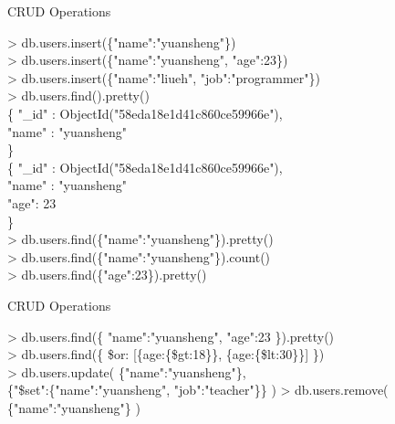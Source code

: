 \documentclass{beamer}
\begin{document}
\begin{frame}{CRUD Operations}
    \begin{minipage}[t]{0.7\textwidth}
        \scriptsize
        \begin{Alms*}
            > db.users.insert(\{"name":"yuansheng"\}) \\
            > db.users.insert(\NI\{"name":"yuansheng", "age":23\}\ND) \\
            > db.users.insert(\NI\{"name":"liueh", "job":"programmer"\}\ND) \\
            > db.users.find().pretty() \\
            \{ \NI
                "\_id" : ObjectId("58eda18e1d41c860ce59966e"), \\
                "name" : "yuansheng" \\
            \ND \} \\
            \{ \NI
                "\_id" : ObjectId("58eda18e1d41c860ce59966e"), \\
                "name" : "yuansheng" \\
                "age": 23 \\
            \ND \} \\
            > db.users.find(\{"name":"yuansheng"\}).pretty() \\
            > db.users.find(\{"name":"yuansheng"\}).count() \\
            > db.users.find(\{"age":23\}).pretty() \\
        \end{Alms*}
    \end{minipage}
\end{frame}

\begin{frame}{CRUD Operations}
	\begin{minipage}[t]{0.45\textwidth}
		\scriptsize
		\begin{Alms*}
			> db.users.find(\{\NI
			"name":"yuansheng", "age":23
			\ND\}).pretty() \\
			> db.users.find(\{ \NI\$or: [\{age:\{\$gt:18\}\}, \{age:\{\$lt:30\}\}] \ND\})\\
			> db.users.update(\NI
			\{"name":"yuansheng"\},\\
			\{"\$set":\{"name":"yuansheng", "job":"teacher"\}\}
			\ND )
			> db.users.remove(\NI
			\{"name":"yuansheng"\}
			\ND )
		\end{Alms*}
	\end{minipage}
\end{frame}
\end{document}
